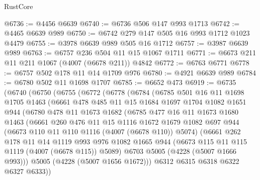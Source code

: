 \begin{lexlean}{RustCore}
\begin{coremodule}
@6736 := @4456 @6639
@6740 := @6736 @506 @147 @993 @1713
@6742 := @4465 @6639 @989
@6750 := @6742 @279 @147 @505 @16 @993 @1712 @1023 @4479
@6755 := @3978 @6639 @989 @505 @16 @1712
@6757 := @3987 @6639 @989
@6763 := @6757 @236 @504 @11 @15 @1067 @1711
@6771 := @6673 @211 @11 @211 @1067 (@4007 (@6678 @211)) @4842
@6772 := @6763 @6771
@6778 := @6757 @502 @178 @11 @14 @1709 @976
@6780 := @4921 @6639 @989
@6784 := @6780 @502 @11 @1698 @1707
@6785 := @6652 @473
@6919 := @6735
    (@6740
      (@6750
        (@6755
          (@6772
            (@6778
              (@6784
                (@6785
                  @501
                  @16
                  @11
                  @1698
                  @1705
                  @1463
                  (@6661
                    @478
                    @485
                    @11
                    @15
                    @1684
                    @1697
                    @1704
                    @1082
                    @1651
                    @944
                    (@6780
                      @478
                      @11
                      @1673
                      @1682
                      (@6785
                        @477
                        @16
                        @11
                        @1673
                        @1680
                        @1463
                        (@6661
                          @260
                          @476
                          @11
                          @15
                          @1116
                          @1672
                          @1679
                          @1082
                          @697
                          @944
                          (@6673 @110 @11 @110 @1116 (@4007 (@6678 @110)) @5074)
                          (@6661
                            @262
                            @178
                            @11
                            @14
                            @1119
                            @993
                            @976
                            @1082
                            @1665
                            @944
                            (@6673 @115 @11 @115 @1119 (@4007 (@6678 @115)) @5089)
                            @6703
                            @5005
                            (@4228 (@5007 @1666 @993)))
                          @5005
                          (@4228 (@5007 @1656 @1672)))
                        @6312
                        @6315
                        @6318
                        @6322
                        @6327
                        @6333))

\end{coremodule}
\end{lexlean}
